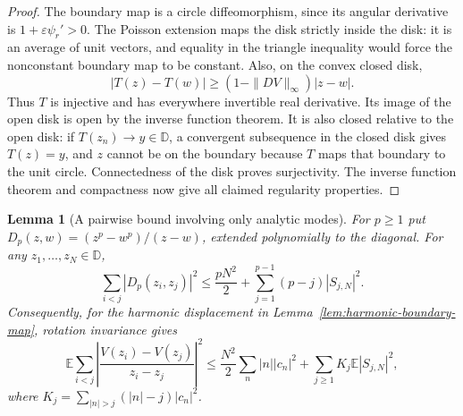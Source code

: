 \documentclass[11pt,a4paper]{article}
\numberwithin{equation}{section}
\newtheorem{lemma}[theorem]{Lemma}
\theoremstyle{definition}
\theoremstyle{remark}
\begin{document}
\begin{proof}
The boundary map is a circle diffeomorphism, since its angular derivative
is $1+\varepsilon\psi_r'>0$. The Poisson extension maps the disk strictly
inside the disk: it is an average of unit vectors, and equality in the
triangle inequality would force the nonconstant boundary map to be
constant. Also, on the convex closed disk,
\[
 |T(z)-T(w)|\geq(1-\|DV\|_\infty)|z-w|.
\]
Thus $T$ is injective and has everywhere invertible real derivative.
Its image of the open disk is open by the inverse function theorem.
It is also closed relative to the open disk: if $T(z_n)\to y\in\mathbb D$,
a convergent subsequence in the closed disk gives $T(z)=y$, and $z$ cannot
be on the boundary because $T$ maps that boundary to the unit circle.
Connectedness of the disk proves surjectivity. The inverse function
theorem and compactness now give all claimed regularity properties.
\end{proof}

\begin{lemma}[A pairwise bound involving only analytic modes]
\label{lem:harmonic-pair-balayage}
For $p\geq1$ put $D_p(z,w)=(z^p-w^p)/(z-w)$, extended polynomially to
the diagonal. For any $z_1,\ldots,z_N\in\mathbb D$,
\begin{equation}
 \sum_{i<j}|D_p(z_i,z_j)|^2
 \leq\frac{pN^2}{2}
       +\sum_{j=1}^{p-1}(p-j)|S_{j,N}|^2.
 \label{eq:harmonic-pair-balayage}
\end{equation}
Consequently, for the harmonic displacement in
Lemma~\ref{lem:harmonic-boundary-map}, rotation invariance gives
\begin{equation}
 \mathbb E\sum_{i<j}
       \left|\frac{V(z_i)-V(z_j)}{z_i-z_j}\right|^2
 \leq\frac{N^2}{2}\sum_n|n||c_n|^2
       +\sum_{j\geq1}K_j\mathbb E|S_{j,N}|^2,
 \label{eq:harmonic-pair-quadratic}
\end{equation}
where $K_j=\sum_{|n|>j}(|n|-j)|c_n|^2$.
\end{lemma}
\end{document}
